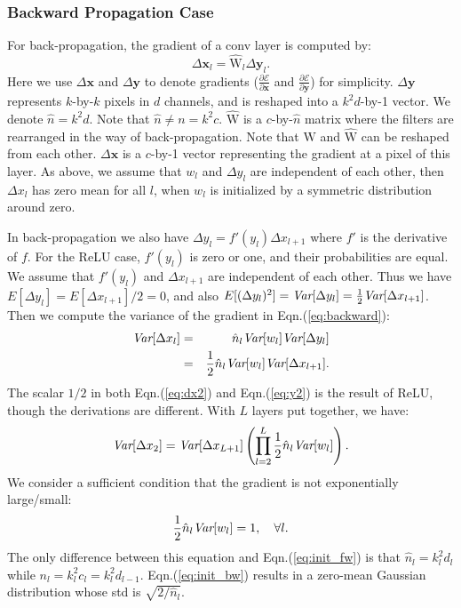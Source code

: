 \documentclass[10pt,twocolumn,letterpaper]{article}
\newcommand{\ve}[1]{\mathbf{#1}} %
\newcommand{\ma}[1]{\mathrm{#1}} %
\newcommand{\var}{\emph{Var}}
\begin{document}
\subsubsection*{Backward Propagation Case}

For back-propagation, the gradient of a conv layer is computed by:
\begin{equation}\label{eq:backward}
\Delta \ve{x}_l = \ma{\hat{W}}_l \Delta \ve{y}_l.
\end{equation}
Here we use $\Delta \ve{x}$ and $\Delta \ve{y}$ to denote gradients ($\frac{\partial\mathcal{E}}{\partial\ve{x}}$ and $\frac{\partial\mathcal{E}}{\partial\ve{y}}$) for simplicity.
$\Delta \ve{y}$ represents $k$-by-$k$ pixels in $d$ channels, and is reshaped into a $k^2d$-by-1 vector. We denote $\hat{n}=k^2d$. Note that $\hat{n}\neq n=k^2c$. $\ma{\hat{W}}$ is a $c$-by-$\hat{n}$ matrix where the filters are rearranged in the way of back-propagation. Note that $\ma{W}$ and $\ma{\hat{W}}$ can be reshaped from each other. $\Delta \ve{x}$ is a $c$-by-1 vector representing the gradient at a pixel of this layer. As above, we assume that $w_l$ and $\Delta y_l$ are independent of each other, then $\Delta x_l$ has zero mean for all $l$, when $w_l$ is initialized by a symmetric distribution around zero.

In back-propagation we also have $\Delta y_{l} = f'(y_l)\Delta x_{l+1}$ where $f'$ is the derivative of $f$. For the ReLU case, $f'(y_l)$ is zero or one, and their probabilities are equal. We assume that $f'(y_l)$ and $\Delta x_{l+1}$ are independent of each other. Thus we have $E[\Delta y_l]=E[\Delta x_{l+1}]/2=0$, and also $E[(\Delta y_l)^2]=\var[\Delta y_l]=\frac{1}{2}\var[\Delta x_{l+1}]$.
Then we compute the variance of the gradient in Eqn.(\ref{eq:backward}):
\begin{eqnarray}
\var[\Delta x_l] &=& \hat{n}_l\var[w_l]\var[\Delta y_l]\nonumber\\
 &=&\frac{1}{2}\hat{n}_l\var[w_l]\var[\Delta x_{l+1}].\label{eq:dx2}
\end{eqnarray}
The scalar $1/2$ in both Eqn.(\ref{eq:dx2}) and Eqn.(\ref{eq:y2}) is the result of ReLU, though the derivations are different.
With $L$ layers put together, we have:
\begin{equation}\label{eq:prod_bw}
\var[\Delta x_2] = \var[\Delta x_{L+1}]\left(\prod_{l=2}^{L}\frac{1}{2}\hat{n}_{l}\var[w_{l}]\right).
\end{equation}
We consider a sufficient condition that the gradient is not exponentially large/small:
\begin{equation}\label{eq:init_bw}
\frac{1}{2}\hat{n}_l\var[w_{l}]=1, \quad \forall l.
\end{equation}
The only difference between this equation and Eqn.(\ref{eq:init_fw}) is that $\hat{n}_l=k_l^2d_l$ while $n_l=k_l^2c_l=k_l^2d_{l-1}$. Eqn.(\ref{eq:init_bw}) results in a zero-mean Gaussian distribution whose std is $\sqrt{2/{\hat{n}_l}}$.
\end{document}
